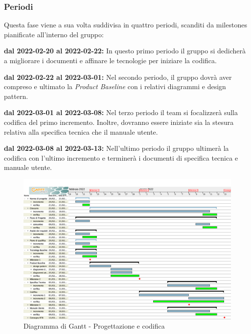 \subsubsection{Periodi}

Questa fase viene a sua volta suddivisa in quattro periodi, scanditi da milestones pianificate all'interno del gruppo:

\textbf{dal 2022-02-20 al 2022-02-22:} In questo primo periodo il gruppo si dedicherà a migliorare i documenti e affinare le tecnologie per iniziare la codifica.

\textbf{dal 2022-02-22 al 2022-03-01:} Nel secondo periodo, il gruppo dovrà aver compreso e ultimato la \textit{Product Baseline} con i relativi diagrammi e design pattern.

\textbf{dal 2022-03-01 al 2022-03-08:} Nel terzo periodo il team si focalizzerà sulla codifica del primo incremento. Inoltre, dovranno essere iniziate sia la stesura relativa alla specifica tecnica che il manuale utente.

\textbf{dal 2022-03-08 al 2022-03-13:} Nell'ultimo periodo il gruppo ultimerà la codifica con l’ultimo incremento e terminerà i documenti di specifica tecnica e manuale utente.

\begin{figure}[H]
\centering
\includegraphics[scale=0.35]{Sezioni/gantt/progettazione_codifica.png}
\caption{Diagramma di Gantt - Progettazione e codifica}
\end{figure}